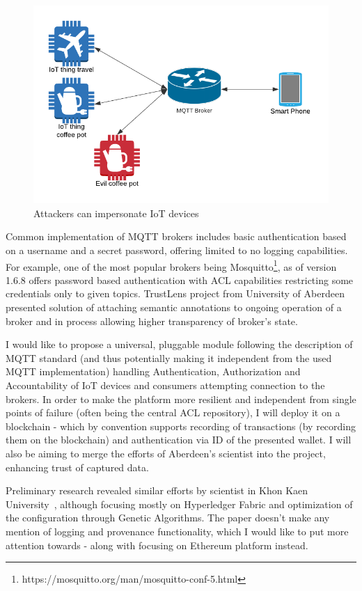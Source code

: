 \documentclass[a4paper,12pt]{article}
\begin{document}
\begin{figure}[ht]
  \centering
  \caption{Attackers can impersonate IoT devices}\label{fig:iot1}
  \includegraphics[scale=0.8]{iot_attack}
\end{figure}

Common implementation of MQTT brokers includes basic authentication based on a username and a secret password, offering limited to no logging capabilities. For example, one of the most popular brokers being Mosquitto\footnote{https://mosquitto.org/man/mosquitto-conf-5.html}, as of version 1.6.8 offers password based authentication with ACL capabilities restricting some credentials only to given topics. TrustLens project from University of Aberdeen presented solution of attaching semantic annotations to ongoing operation of a broker and in process allowing higher transparency of broker's state\cite{10.1145/3366610.3368099}.

I would like to propose a universal, pluggable module following the description of MQTT standard (and thus potentially making it independent from the used MQTT implementation) handling Authentication, Authorization and Accountability of IoT devices and consumers attempting connection to the brokers. In order to make the platform more resilient and independent from single points of failure (often being the central ACL repository), I will deploy it on a blockchain - which by convention supports recording of transactions (by recording them on the blockchain) and authentication via ID of the presented wallet. I will also be aiming to merge the efforts of Aberdeen's scientist into the project, enhancing trust of captured data.

Preliminary research revealed similar efforts by scientist in Khon Kaen University~\cite{8523942}, although focusing mostly on Hyperledger Fabric and optimization of the configuration through Genetic Algorithms. The paper doesn't make any mention of logging and provenance functionality, which I would like to put more attention towards - along with focusing on Ethereum platform instead.
\end{document}
